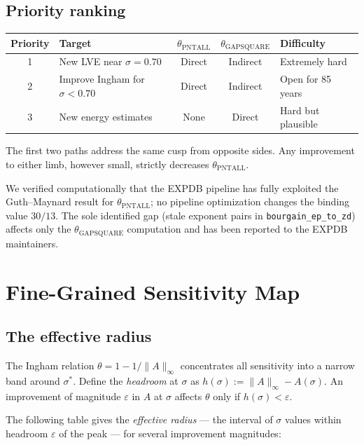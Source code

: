 \documentclass[11pt,a4paper]{article}
\begin{document}
\subsection*{Priority ranking}

\begin{center}
\begin{tabular}{clccl}
\toprule
Priority & Target & $\theta_{\mathrm{PNTALL}}$ & $\theta_{\mathrm{GAPSQUARE}}$ & Difficulty \\
\midrule
1 & New LVE near $\sigma = 0.70$       & Direct & Indirect & Extremely hard \\
2 & Improve Ingham for $\sigma < 0.70$ & Direct & Indirect & Open for 85 years \\
3 & New energy estimates                & None   & Direct   & Hard but plausible \\
\bottomrule
\end{tabular}
\end{center}

The first two paths address the same cusp from opposite sides.  Any improvement to either limb, however small, strictly decreases $\theta_{\mathrm{PNTALL}}$.

We verified computationally that the EXPDB pipeline has fully exploited the Guth--Maynard result for $\theta_{\mathrm{PNTALL}}$; no pipeline optimization changes the binding value $30/13$.  The sole identified gap (stale exponent pairs in \texttt{bourgain\_ep\_to\_zd}) affects only the $\theta_{\mathrm{GAPSQUARE}}$ computation and has been reported to the EXPDB maintainers.

\section{Fine-Grained Sensitivity Map}

\subsection*{The effective radius}

The Ingham relation $\theta = 1 - 1/\|A\|_{\infty}$ concentrates all sensitivity into a narrow band around $\sigma^{*}$.  Define the \emph{headroom} at $\sigma$ as $h(\sigma) := \|A\|_{\infty} - A(\sigma)$.  An improvement of magnitude $\varepsilon$ in $A$ at $\sigma$ affects $\theta$ only if $h(\sigma) < \varepsilon$.

The following table gives the \emph{effective radius} --- the interval of $\sigma$ values within headroom $\varepsilon$ of the peak --- for several improvement magnitudes:
\end{document}
